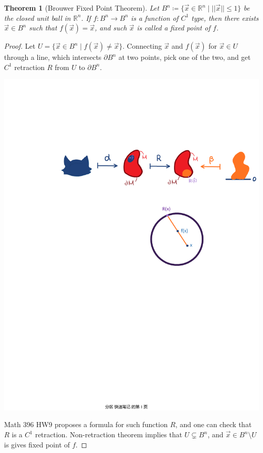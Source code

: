 \documentclass[11pt,oneside]{book}
\theoremstyle{break}
\theoremstyle{break}
\newtheorem{thm}{Theorem}[section]
\newcommand{\R}{\mathbb{R}}
\begin{document}
\begin{thm}[Brouwer Fixed Point Theorem]
Let $B^n\coloneqq \{ \vec{x}\in \R^n \mid ||\vec{x}|| \leq 1 \}$ be the closed unit ball in $\R^n$. 
If $f:B^n \to B^n$ is a function of $C^1$ type, then there exists $\vec{x}\in B^n$ such that $f(\vec{x}) = \vec{x}$, and such $\vec{x}$ is called a fixed point of $f$. 
\end{thm}
\begin{proof}
Let $U = \{ \vec{x}\in B^n \mid f(\vec{x}) \neq \vec{x}\}$. Connecting $\vec{x}$ and $f(\vec{x})$ for $\vec{x}\in U$ through a line, which intersects $\partial B^n$ at two points, pick one of the two, and get $C^1$ retraction $R$ from $U$ to $\partial B^n$. 
\begin{center}
\includegraphics[scale=0.9]{fixpt.pdf}
\end{center}
Math 396 HW9 proposes a formula for such function $R$, and one can check that $R$ is a $C^1$ retraction. Non-retraction theorem implies that $U \subsetneq B^n$, and $\vec{x}\in B^n\setminus U$ is gives fixed point of $f$.
\end{proof}
\end{document}
